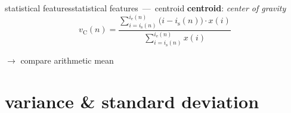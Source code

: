         \begin{frame}{statistical features}{statistical features~---~centroid}
            \textbf{centroid}: \textit{center of gravity}
			\begin{equation*}\label{eq:centroid}
				v_{\mathrm{C}}(n) = \frac{\sum\limits_{i=i_{\mathrm{s}}(n)}^{i_{\mathrm{e}}(n)}{\big(i-i_{\mathrm{s}}(n)\big)\cdot x(i)}}{\sum\limits_{i=i_{\mathrm{s}}(n)}^{i_{\mathrm{e}}(n)}{x(i)}} 
			\end{equation*}
            
            \pause
            
            $\rightarrow$ compare arithmetic mean
        \end{frame}
    \section[variance]{variance \& standard deviation}
